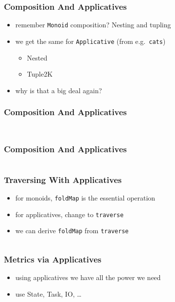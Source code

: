 \documentclass[aspectratio=169]{beamer}
\begin{document}
\begin{frame}
  \frametitle{Composition And Applicatives}
  \begin{itemize}
  \item remember \texttt{Monoid} composition? Nesting and tupling
  \item we get the same for \texttt{Applicative} (from e.g.\ \texttt{cats})
    \begin{itemize}
    \item Nested
    \item Tuple2K
    \end{itemize}
  \item why is that a big deal again?
  \end{itemize}
\end{frame}

\begin{frame}[fragile]
  \frametitle{Composition And Applicatives}
  \inputminted[fontsize=\small]{scala}{snippets/compose-applicative-monoid.scala}
  \inputminted[fontsize=\small]{scala}{snippets/compose-applicative-1.scala}
\end{frame}

\begin{frame}[fragile]
  \frametitle{Composition And Applicatives}
  \inputminted[fontsize=\small]{scala}{snippets/compose-applicative-2.scala}
\end{frame}

\begin{frame}
  \frametitle{Traversing With Applicatives}
  \begin{itemize}
  \item for monoids, \texttt{foldMap} is the essential operation
  \item for applicatives, change to \texttt{traverse}
  \item we can derive \texttt{foldMap} from \texttt{traverse}
  \end{itemize}
  \vspace{1cm}
  \inputminted[fontsize=\small]{scala}{snippets/traverse-def.scala}
\end{frame}

\begin{frame}
  \frametitle{Metrics via Applicatives}
  \begin{itemize}
  \item using applicatives we have all the power we need
  \item use State, Task, IO, \ldots
  \end{itemize}
\end{frame}
\end{document}
